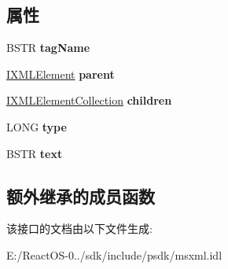 \subsection*{属性}
\begin{DoxyCompactItemize}
\item 
\mbox{\label{interface_m_s_x_m_l_1_1_i_x_m_l_element_ab408ec26cdaa9a8c93626f00a773dbbe}} 
B\+S\+TR {\bfseries tag\+Name}
\item 
\mbox{\label{interface_m_s_x_m_l_1_1_i_x_m_l_element_a3085bc3b89c65a98b117cdecbd18018b}} 
\hyperlink{interface_m_s_x_m_l_1_1_i_x_m_l_element}{I\+X\+M\+L\+Element} {\bfseries parent}
\item 
\mbox{\label{interface_m_s_x_m_l_1_1_i_x_m_l_element_abc52ad3a3af59f437d471c5b177bda62}} 
\hyperlink{interface_m_s_x_m_l_1_1_i_x_m_l_element_collection}{I\+X\+M\+L\+Element\+Collection} {\bfseries children}
\item 
\mbox{\label{interface_m_s_x_m_l_1_1_i_x_m_l_element_a02da883c8298743dc4d6d19d56d8bccc}} 
L\+O\+NG {\bfseries type}
\item 
\mbox{\label{interface_m_s_x_m_l_1_1_i_x_m_l_element_a555d2f1fe18f843bea6002e9d06c1196}} 
B\+S\+TR {\bfseries text}
\end{DoxyCompactItemize}
\subsection*{额外继承的成员函数}


该接口的文档由以下文件生成\+:\begin{DoxyCompactItemize}
\item 
E\+:/\+React\+O\+S-\/0../sdk/include/psdk/msxml.\+idl\end{DoxyCompactItemize}
